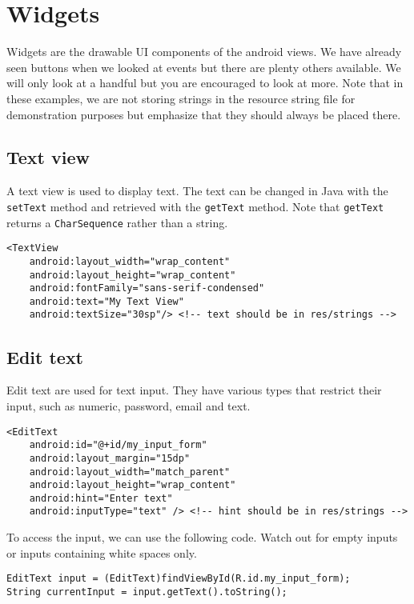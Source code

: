 \section{Widgets}
Widgets are the drawable UI components of the android views. We have already seen buttons when we looked at events but there are plenty others available. We will only look at a handful but you are encouraged to look at more. Note that in these examples, we are not storing strings in the resource string file for demonstration purposes but emphasize that they should always be placed there.

\subsection{Text view}
A text view is used to display text. The text can be changed in Java with the \texttt{setText} method and retrieved with the \texttt{getText} method. Note that \texttt{getText} returns a \texttt{CharSequence} rather than a string.
\begin{lstlisting}[style=A_XML, caption={Text view declaration}, label = {listing:dectext}]
<TextView
    android:layout_width="wrap_content"
    android:layout_height="wrap_content"
    android:fontFamily="sans-serif-condensed"
    android:text="My Text View"
    android:textSize="30sp"/> <!-- text should be in res/strings -->
\end{lstlisting}

\subsection{Edit text}
Edit text are used for text input. They have various types that restrict their input, such as numeric, password, email and text. 
\begin{lstlisting}[style=A_XML, caption={Edit text declaration}, label = {listing:edittext}]
<EditText
    android:id="@+id/my_input_form"
    android:layout_margin="15dp"
    android:layout_width="match_parent"
    android:layout_height="wrap_content"
    android:hint="Enter text"
    android:inputType="text" /> <!-- hint should be in res/strings -->
\end{lstlisting}
To access the input, we can use the following code. Watch out for empty inputs or inputs containing white spaces only.
\begin{lstlisting}[style=A_Java]
EditText input = (EditText)findViewById(R.id.my_input_form);
String currentInput = input.getText().toString();
\end{lstlisting}

